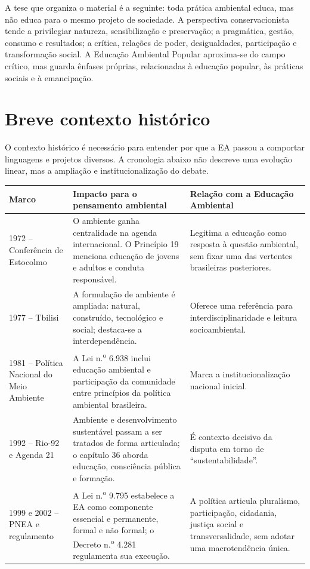 \documentclass[12pt,a4paper]{article}
\begin{document}
A tese que organiza o material é a seguinte: toda prática ambiental educa, mas não educa para o mesmo projeto de sociedade. A perspectiva conservacionista tende a privilegiar natureza, sensibilização e preservação; a pragmática, gestão, consumo e resultados; a crítica, relações de poder, desigualdades, participação e transformação social. A Educação Ambiental Popular aproxima-se do campo crítico, mas guarda ênfases próprias, relacionadas à educação popular, às práticas sociais e à emancipação.

\section{Breve contexto histórico}

O contexto histórico é necessário para entender por que a EA passou a comportar linguagens e projetos diversos. A cronologia abaixo não descreve uma evolução linear, mas a ampliação e institucionalização do debate.

\begin{longtable}{p{}p{}p{}}
\toprule
\textbf{Marco} & \textbf{Impacto para o pensamento ambiental} & \textbf{Relação com a Educação Ambiental} \\
\midrule
\endhead
1972 -- Conferência de Estocolmo & O ambiente ganha centralidade na agenda internacional. O Princípio 19 menciona educação de jovens e adultos e conduta responsável. & Legitima a educação como resposta à questão ambiental, sem fixar uma das vertentes brasileiras posteriores. \\
1977 -- Tbilisi & A formulação de ambiente é ampliada: natural, construído, tecnológico e social; destaca-se a interdependência. & Oferece uma referência para interdisciplinaridade e leitura socioambiental. \\
1981 -- Política Nacional do Meio Ambiente & A Lei n.\textsuperscript{o} 6.938 inclui educação ambiental e participação da comunidade entre princípios da política ambiental brasileira. & Marca a institucionalização nacional inicial. \\
1992 -- Rio-92 e Agenda 21 & Ambiente e desenvolvimento sustentável passam a ser tratados de forma articulada; o capítulo 36 aborda educação, consciência pública e formação. & É contexto decisivo da disputa em torno de ``sustentabilidade''. \\
1999 e 2002 -- PNEA e regulamento & A Lei n.\textsuperscript{o} 9.795 estabelece a EA como componente essencial e permanente, formal e não formal; o Decreto n.\textsuperscript{o} 4.281 regulamenta sua execução. & A política articula pluralismo, participação, cidadania, justiça social e transversalidade, sem adotar uma macrotendência única. \\
\bottomrule
\end{longtable}
\end{document}
